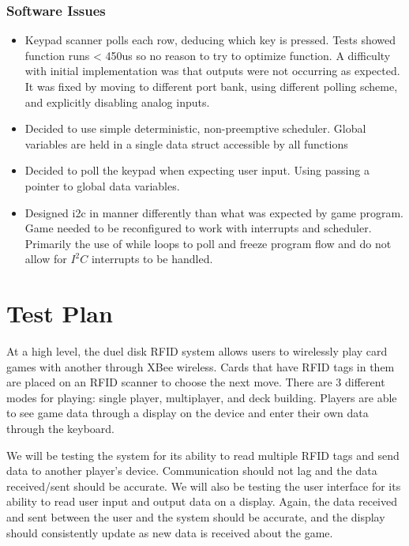 \documentclass[12pt]{article} %
\begin{document}
\subsubsection{Software Issues}
\begin{itemize}
	\item Keypad scanner polls each row, deducing which key is pressed. Tests showed function runs < 450us so no reason to try to optimize function. A difficulty with initial implementation was that outputs were not occurring as expected. It was fixed by moving to different port bank, using different polling scheme, and explicitly disabling analog inputs.
	\item Decided to use simple deterministic, non-preemptive scheduler. Global variables are held in a single data struct accessible by all functions
	\item Decided to poll the keypad when expecting user input. Using passing a pointer to global data variables.
	\item Designed i2c in manner differently than what was expected by game program. Game needed to be reconfigured to work with interrupts and scheduler. Primarily the use of while loops to poll and freeze program flow and do not allow for $I^2C$ interrupts to be handled.
\end{itemize}


\section{Test Plan } %
%

At a high level, the duel disk RFID system allows users to wirelessly play card games with another through XBee wireless. Cards that have RFID tags in them are placed on an RFID scanner to choose the next move.  There are 3 different modes for playing: single player, multiplayer, and deck building. Players are able to see game data through a display on the device and enter their own data through the keyboard. 

We will be testing the system for its ability to read multiple RFID tags and send data to another player’s device. Communication should not lag and the data received/sent should be accurate. We will also be testing the user interface for its ability to read user input and output data on a display. Again, the data received and sent between the user and the system should be accurate, and the display should consistently update as new data is received about the game.
\end{document}
